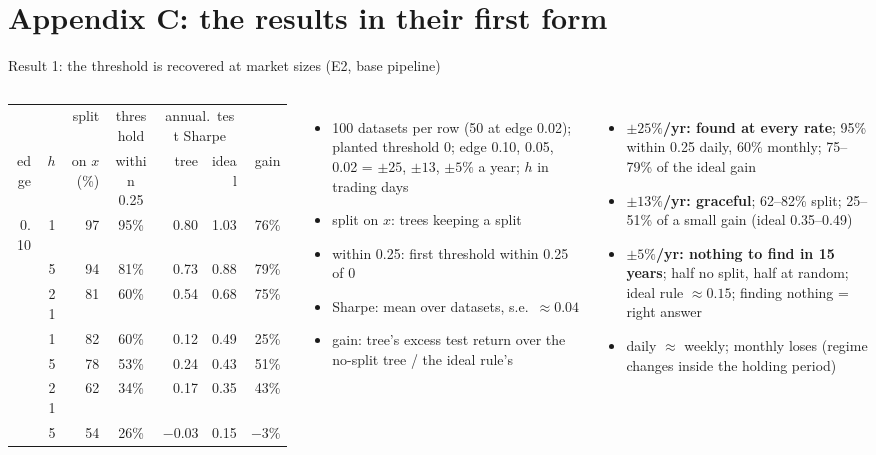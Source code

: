 \documentclass[10pt,aspectratio=169]{beamer}
\newcommand{\1}{\mathbf{1}}
\begin{document}
\section{Appendix C: the results in their first form}
\begin{frame}{Result 1: the threshold is recovered at market sizes (E2, base pipeline)}
\begin{columns}[T]
\scriptsize\setlength{\tabcolsep}{3pt}
\begin{tabular}{@{}rr r c rr r@{}}
\toprule
& & split & threshold & \multicolumn{2}{c}{annual.\ test Sharpe} & \\
\cmidrule(lr){5-6}
edge & $h$ & on $x$ (\%) & within 0.25 & tree & ideal & gain\\
\midrule
0.10 & 1 & 97 & 95\% & 0.80 & 1.03 & 76\%\\
 & 5 & 94 & 81\% & 0.73 & 0.88 & 79\%\\
 & 21 & 81 & 60\% & 0.54 & 0.68 & 75\%\\
\addlinespace
0.05 & 1 & 82 & 60\% & 0.12 & 0.49 & 25\%\\
 & 5 & 78 & 53\% & 0.24 & 0.43 & 51\%\\
 & 21 & 62 & 34\% & 0.17 & 0.35 & 43\%\\
\addlinespace
0.02 & 5 & 54 & 26\% & $-0.03$ & 0.15 & $-3\%$\\
\bottomrule
\end{tabular}

\smallskip
\begin{itemize}
\item 100 datasets per row (50 at edge 0.02); planted threshold 0; edge 0.10, 0.05, 0.02 = $\pm25$, $\pm13$, $\pm5\%$ a year; $h$ in trading days
\item split on $x$: trees keeping a split
\item within 0.25: first threshold within 0.25 of 0
\item Sharpe: mean over datasets, s.e.\ $\approx0.04$
\item gain: tree's excess test return over the no-split tree / the ideal rule's
\end{itemize}
\small
\begin{itemize}
\item \textbf{$\pm25\%$/yr: found at every rate}; 95\% within 0.25 daily, 60\% monthly; 75--79\% of the ideal gain
\item \textbf{$\pm13\%$/yr: graceful}; 62--82\% split; 25--51\% of a small gain (ideal 0.35--0.49)
\item \textbf{$\pm5\%$/yr: nothing to find in 15 years}; half no split, half at random; ideal rule $\approx0.15$; finding nothing = right answer
\item daily $\approx$ weekly; monthly loses (regime changes inside the holding period)
\end{itemize}
\end{columns}
\end{frame}
\end{document}
